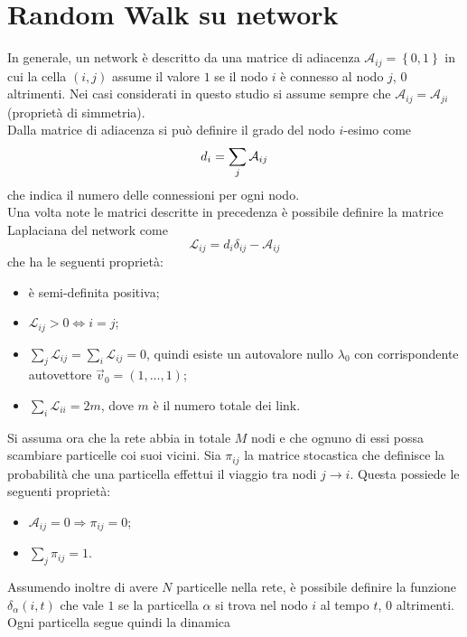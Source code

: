 \documentclass[../main.tex]{subfiles}
\begin{document}
\section{Random Walk su network}
In generale, un network \`e descritto da una matrice di adiacenza $\mathcal{A}_{ij}=\left\{0,1\right\}$ in cui la cella $(i,j)$ assume il valore $1$ se il nodo $i$ \`e connesso al nodo $j$, $0$ altrimenti.
Nei casi considerati in questo studio si assume sempre che $\mathcal{A}_{ij}=\mathcal{A}_{ji}$ (proprietà di simmetria).
\\Dalla matrice di adiacenza si pu\`o definire il grado del nodo $i$-esimo come
\begin{equation*}
    d_i=\sum_j\mathcal{A}_{ij}\\
\end{equation*}
che indica il numero delle connessioni per ogni nodo.
\\Una volta note le matrici descritte in precedenza \`e possibile definire la matrice Laplaciana del network come
\begin{equation}
    \mathcal{L}_{ij}=d_i\delta_{ij}-\mathcal{A}_{ij}
\end{equation}
che ha le seguenti propriet\`a:
\begin{itemize}
    \item \`e semi-definita positiva;
    \item $\mathcal{L}_{ij}>0\Longleftrightarrow i=j$;
    \item $\sum_j\mathcal{L}_{ij}=\sum_i\mathcal{L}_{ij}=0$, quindi esiste un autovalore nullo $\lambda_0$ con corrispondente autovettore $\vec{v}_0=(1,\ldots,1)$;
    \item $\sum_i\mathcal{L}_{ii}=2m$, dove $m$ \`e il numero totale dei link.
\end{itemize}
Si assuma ora che la rete abbia in totale $M$ nodi e che ognuno di essi possa scambiare particelle coi suoi vicini.
Sia $\pi_{ij}$ la matrice stocastica che definisce la probabilità che una particella effettui il viaggio tra nodi $j\to i$.
Questa possiede le seguenti proprietà:
\begin{itemize}
    \item $\mathcal{A}_{ij}=0 \Longrightarrow \pi_{ij}=0$;
    \item $\sum_j\pi_{ij}=1$.
\end{itemize}
Assumendo inoltre di avere $N$ particelle nella rete, \`e possibile definire la funzione $\delta_\alpha(i,t)$ che vale $1$ se la particella $\alpha$ si trova nel nodo $i$ al tempo $t$, 0 altrimenti.
\\Ogni particella segue quindi la dinamica
\end{document}
